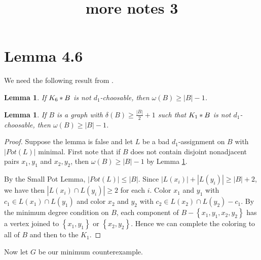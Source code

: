 \documentclass[12pt]{amsart}
\title{more notes 3}
\theoremstyle{plain}
\newtheorem{lem}[thm]{Lemma}
\theoremstyle{definition}
\theoremstyle{plain}
\newcommand{\set}[1]{\left\{ #1 \right\}}
\newcommand{\card}[1]{\left|#1\right|}
\newcommand{\join}[2]{#1 \mbox{\hspace{2 pt}$\ast$\hspace{2 pt}} #2}
\begin{document}
\maketitle

\section{Lemma 4.6}

We need the following result from \cite{mules}.

\begin{lem}\label{K6Possibilities}
If $\join{K_6}{B}$ is not $d_1$-choosable, then $\omega(B) \geq \card{B} - 1$.
\end{lem}

\begin{lem}\label{neighborhood}
If $B$ is a graph with $\delta(B) \geq \frac{\card{B}}{2} + 1$ such that
$\join{K_1}{B}$ is not $d_1$-choosable, then $\omega(B) \geq \card{B} - 1$.
\end{lem}
\begin{proof}
Suppose the lemma is false and let $L$ be a bad $d_1$-assignment on $B$ with $\card{Pot(L)}$ minimal. First note that if $B$ does not contain disjoint nonadjacent pairs $x_1, y_1$
and $x_2, y_2$, then $\omega(B) \geq \card{B} - 1$ by Lemma \ref{K6Possibilities}.

By the Small Pot Lemma, $\card{Pot(L)} \leq \card{B}$.  Since $\card{L(x_i)} +
\card{L(y_i)} \geq \card{B} + 2$, we have then $\card{L(x_i) \cap L(y_i)} \geq 2$ for each $i$.  Color $x_1$ and $y_1$ with $c_1 \in L(x_1) \cap L(y_1)$ and color $x_2$ and $y_2$ with $c_2 \in L(x_2) \cap L(y_2) - c_1$.  By the minimum degree condition on $B$, each component of $B - \set{x_1, y_1, x_2, y_2}$ has a vertex joined to $\set{x_1, y_1}$ or $\set{x_2, y_2}$.  Hence we can complete the coloring to all of $B$ and then to the $K_1$.
\end{proof}

Now let $G$ be our minimum counterexample.
\end{document}
